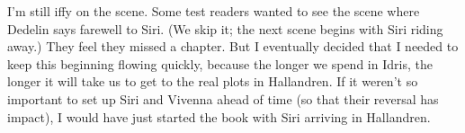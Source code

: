 I’m still iffy on the scene. Some test readers wanted to see the scene where Dedelin says farewell to Siri. (We skip it; the next scene begins with Siri riding away.) They feel they missed a chapter. But I eventually decided that I needed to keep this beginning flowing quickly, because the longer we spend in Idris, the longer it will take us to get to the real plots in Hallandren. If it weren’t so important to set up Siri and Vivenna ahead of time (so that their reversal has impact), I would have just started the book with Siri arriving in Hallandren.



